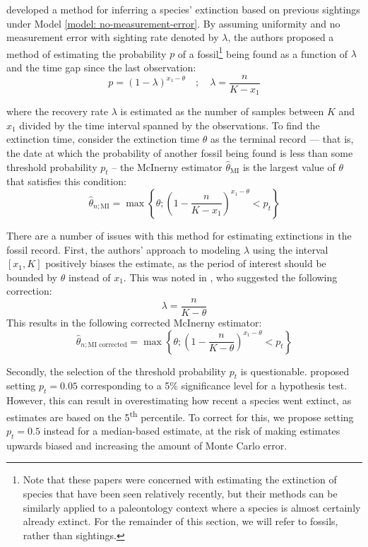 \citet{Mcinerny2006} developed a method for inferring a species' extinction based on previous sightings under Model \ref{model: no-measurement-error}. By assuming uniformity and no measurement error with sighting rate denoted by $\lambda$, the authors proposed a method of estimating the probability $p$ of a fossil\footnote{Note that these papers were concerned with estimating the extinction of species that have been seen relatively recently, but their methods can be similarly applied to a paleontology context where a species is almost certainly already extinct. For the remainder of this section, we will refer to fossils, rather than sightings.} being found as a function of $\lambda$ and the time gap since the last observation:
\[
p = \left( 1 - \lambda \right)^{x_1 - \theta} \quad;\quad \lambda = \frac{n}{K - x_1}
\]

where the recovery rate $\lambda$ is estimated as the number of samples between $K$ and $x_1$ divided by the time interval spanned by the observations. To find the extinction time, consider the extinction time $\theta$ as the terminal record --- that is, the date at which the probability of another fossil being found is less than some threshold probability $p_t$ -- the McInerny estimator $\hat\theta_{\text{MI}}$ is the largest value of $\theta$ that satisfies this condition:
\begin{equation}\label{eqn:mcinerny-estimator}
    \hat\theta_{n; \text{MI}} = \max\left\{ \theta ; \left( 1 - \frac{n}{K - x_1} \right)^{x_1 - \theta} < p_t \right\}
\end{equation}

There are a number of issues with this method for estimating extinctions in the fossil record. First, the authors' approach to modeling $\lambda$ using the interval $[x_1, K]$ positively biases the estimate, as the period of interest should be bounded by $\theta$ instead of $x_1$. This was noted in \citet{Huang2019}, who suggested the following correction: \[ \lambda = \frac{n}{K - \theta} \] This results in the following corrected McInerny estimator: \begin{equation}\label{eqn:mcinerny-bias-corrected-estimator}
    \hat\theta_{n; \text{MI corrected}} = \max\left\{ \theta ; \left( 1 - \frac{n}{K - \theta} \right)^{x_1 - \theta} < p_t \right\}
\end{equation}

Secondly, the selection of the threshold probability $p_t$ is questionable. \citet{Mcinerny2006} proposed setting $p_t = 0.05$ corresponding to a 5\% significance level for a hypothesis test. However, this can result in overestimating how recent a species went extinct, as estimates are based on the 5\textsuperscript{th} percentile. To correct for this, we propose setting $p_t = 0.5$ instead for a median-based estimate, at the risk of making estimates upwards biased and increasing the amount of Monte Carlo error.


